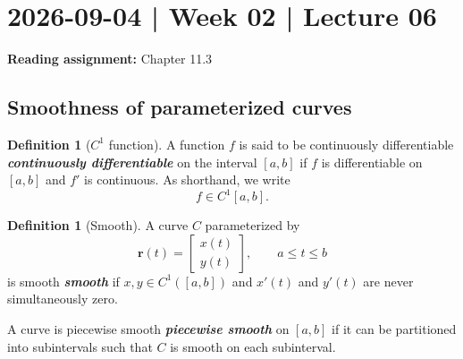 \documentclass[10pt]{article}
\DeclareRobustCommand{\demph}[1]{%
  \ifmmode
  {\color{Blue}#1}%
  \else
  {\color{Blue}\bfseries\slshape #1}%
  \fi
}
\theoremstyle{definition}
\newtheorem{definition}[theorem]{Definition}
\newcommand{\1}[1]{\textbf{1}_{\left[#1\right]}} %
\begin{document}
\newpage


\section{2026-09-04 | Week 02 | Lecture 06}
\textbf{Reading assignment:} Chapter 11.3

\subsection{Smoothness of parameterized curves}

\begin{definition}[$C^1$ function]
  A function $f$ is said to be \demph{continuously differentiable} on the
  interval $[a,b]$ if $f$ is differentiable on $[a,b]$ and $f'$ is continuous.
  As shorthand, we write
  \begin{equation*}
    f\in C^{1}[a,b].
  \end{equation*}
\end{definition}
\begin{definition}[Smooth]
  \label{def:smooth}
  A curve $C$ parameterized by
  \begin{equation*}
    \mathbf{r}(t) =
    \begin{bmatrix}
      x(t)\\y(t)
    \end{bmatrix},
    \qquad a \leq t \leq b
  \end{equation*}
  is \demph{smooth} if $x,y\in C^{1}([a,b])$ and $x'(t)$ and $y'(t)$ are never
  simultaneously zero.

  A curve is \demph{piecewise smooth} on $[a,b]$ if it can be partitioned into
  subintervals such that $C$ is smooth on each subinterval.
\end{definition}
\end{document}

